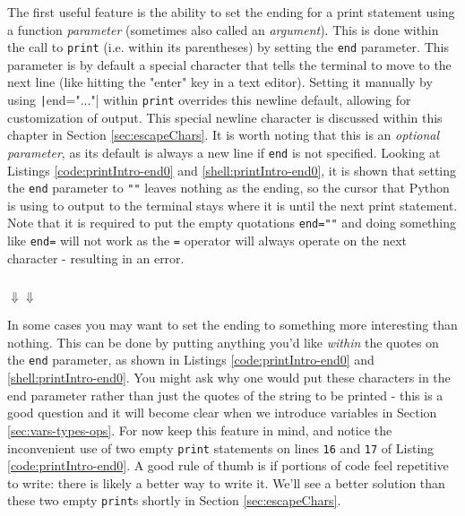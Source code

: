 \documentclass{book}
\newcommand{\pythonSub}[5]{
    \usemintedstyle{autumn}
    \begin{listing}[htb]
        \begin{mdframed}[backgroundcolor=codebg]
            \inputminted[firstline=#2, lastline=#3, linenos]{python}{#1}
        \end{mdframed}
        \caption{#4}
        \label{#5}
    \end{listing}
}
\newcommand{\shellSub}[5]{
    \begin{listing}[htb]
        \begin{mdframed}[backgroundcolor=codebg]
              
        \end{mdframed}
        \caption{#4}
        \label{#5}
    \end{listing}
}
\newcommand{\pythonAndShellSub}[8]{
\usemintedstyle{autumn}
    \begin{listing}[htb]
 	   \begin{mdframed}[backgroundcolor=codebg]
            \inputminted[firstline=#2, lastline=#3, linenos]{python}{#1}
        \end{mdframed}
        \hspace{5em}$\Downarrow$\hfill$\Downarrow$\hspace{5em}
        \begin{mdframed}[backgroundcolor=codebg]
              
        \end{mdframed}
        \caption{#7}
        \label{#8}
    \end{listing}
}
\begin{document}
The first useful feature is the ability to set the ending for a print statement using a function \emph{parameter} (sometimes also called an \emph{argument}). This is done within the call to \texttt{print} (i.e. within its parentheses) by setting the \texttt{end} parameter. This parameter is by default a special character that tells the terminal to move to the next line (like hitting the "enter" key in a text editor). Setting it manually by using \texttt|end="..."| within \texttt{print} overrides this newline default, allowing for customization of output. This special newline character is discussed within this chapter in Section \ref{sec:escapeChars}. It is worth noting that this is an \emph{optional parameter}, as its default is always a new line if \texttt{end} is not specified. Looking at Listings \ref{code:printIntro-end0} and \ref{shell:printIntro-end0}, it is shown that setting the \texttt{end} parameter to \texttt{""} leaves nothing as the ending, so the cursor that Python is using to output to the terminal stays where it is until the next print statement. Note that it is required to put the empty quotations \texttt{end=""} and doing something like \texttt{end=} will not work as the \texttt{=} operator will always operate on the next character - resulting in an error.

%

\pythonAndShellSub{../../../docCode/chapter2/section2/printIntro.py}
{2}{18}
{../../../docCode/chapter2/section2/printIntro.txt}
{3}{10}
{}
{pyshell:printIntro-end0}

In some cases you may want to set the ending to something more interesting than nothing. This can be done by putting anything you'd like \textit{within} the quotes on the \texttt{end} parameter, as shown in Listings \ref{code:printIntro-end0} and \ref{shell:printIntro-end0}. You might ask why one would put these characters in the end parameter rather than just the quotes of the string to be printed - this is a good question and it will become clear when we introduce variables in Section \ref{sec:vars-types-ops}. For now keep this feature in mind, and notice the inconvenient use of two empty \texttt{print} statements on lines \texttt{16} and \texttt{17} of Listing \ref{code:printIntro-end0}. A good rule of thumb is if portions of code feel repetitive to write: there is likely a better way to write it. We'll see a better solution than these two empty \texttt{print}s shortly in Section \ref{sec:escapeChars}.
\end{document}
